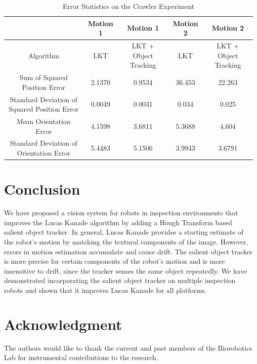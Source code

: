 \documentclass[letterpaper, 10 pt, conference]{ieeeconf}
\newcommand{\comment}[1]{} %
\begin{document}
\begin{table}[tb]
	\centering
	\footnotesize
	\setlength{\tabcolsep}{.6em}
	\caption{Error Statistics on the Crawler Experiment}
	\label{table:crawler_results}
	\begin{tabular}{c|c|c|c|c|}
	\hline
	& Motion 1 & Motion 1 & Motion 2 & Motion 2\\
	\hline
	Algorithm & LKT & LKT + Object Tracking & LKT & LKT + Object Tracking\\ 
	\hline
	Sum of Squared Position Error & 2.1370 & 0.9534 & 36.453 & 22.263\\
	\hline
	Standard Deviation of Squared Position Error & 0.0049 & 0.0031 & 0.034 & 0.025\\
	\hline
	Mean Orientation Error & 4.1598 & 3.6811 & 5.3688 & 4.604\\
	\hline
	Standard Deviation of Orientation Error & 5.4483 & 5.1506 & 3.9943 & 3.6791\\
	\hline
	\end{tabular}
\end{table}

\section{Conclusion}

We have proposed a vision system for robots in inspection environments that improves the Lucas Kanade algorithm by adding a Hough Transform based salient object tracker. In general, Lucas Kanade provides a starting estimate of the robot's motion by matching the textural components of the image. However, errors in motion estimation accumulate and cause drift. The salient object tracker is more precise for certain components of the robot's motion and is more insensitive to drift, since the tracker senses the same object repeatedly. We have demonstrated incorporating the salient object tracker on multiple inspection robots and shown that it improves Lucas Kanade for all platforms.



\addtolength{\textheight}{-1cm}

\section*{Acknowledgment}

The authors would like to thank the current and past members of the Biorobotics Lab for instrumental contributions to the research.



\end{document}
